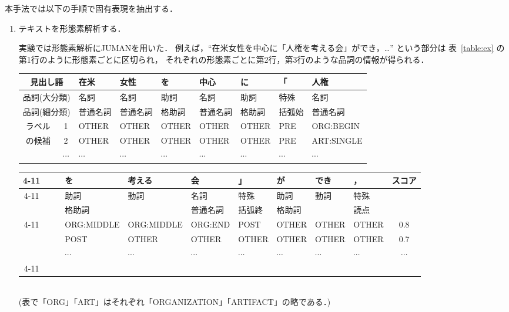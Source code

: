 本手法では以下の手順で固有表現を抽出する．
\begin{enumerate}
\item テキストを形態素解析する．

  実験では形態素解析にJUMAN\cite{JUMAN3.6}を用いた．
  例えば，``在米女性を中心に「人権を考える会」ができ，…''
  という部分は
  表~\ref{table:ex} の第1行のように形態素ごとに区切られ，
  それぞれの形態素ごとに第2行，第3行のような品詞の情報が得られる．

  {\small
    \begin{table*}[htbp]
      \begin{center}
        \caption{MEモデルを用いたラベル付与の例}
        \label{table:ex} 
        \begin{tabular}[c]{|c|c||l@{ }l@{ }l@{ }l@{ }l@{ }l@{ }l}
          \hline
          \multicolumn{2}{|c||}{見出し語} 
          & 在米 & 女性 & を & 中心 & に & 「 & 人権 \\
          \hline
          \multicolumn{2}{|c||}{品詞(大分類)} 
          & 名詞 & 名詞 & 助詞 & 名詞 & 助詞 & 特殊 & 名詞 \\
          \multicolumn{2}{|c||}{品詞(細分類)}
          & 普通名詞 & 普通名詞 & 格助詞 & 普通名詞 & 格助詞 
          & 括弧始 & 普通名詞 \\
          \hline
          ラベル & 1 & OTHER & OTHER & OTHER & OTHER & OTHER & PRE
          & ORG:BEGIN \\
          の候補 & 2 & OTHER & OTHER & OTHER & OTHER & OTHER & PRE 
          & ART:SINGLE \\
          & $\cdots$ & $\cdots$ & $\cdots$ & $\cdots$ & $\cdots$ & $\cdots$ 
          & $\cdots$ & $\cdots$ \\
          \hline
        \end{tabular}

        \vspace*{0.2cm}
        \begin{tabular}[c]{cccl@{ }l@{ }l@{ }l@{ }l@{ }l@{ }l|c|}
          \cline{4-11}
          & & & を & 考える & 会 & 」 & が & でき & ，& スコア\\
          \cline{4-11}
          & & & 助詞 & 動詞 & 名詞 & 特殊 & 助詞 & 動詞 & 特殊 & \\
          & & & 格助詞 & \* & 普通名詞 & 括弧終 & 格助詞 & \* & 読点 & \\
          \cline{4-11}
          & & & ORG:MIDDLE & ORG:MIDDLE & ORG:END & POST & OTHER 
          & OTHER & OTHER & 0.8\\
          & & & POST & OTHER & OTHER & OTHER & OTHER & OTHER & OTHER & 0.7\\
           & & & $\cdots$ & $\cdots$ & $\cdots$ & $\cdots$ & $\cdots$ 
          & $\cdots$ & $\cdots$ & $\cdots$ \\
          \cline{4-11}
        \end{tabular}\\
        \vspace*{1em}
      (表で「ORG」「ART」はそれぞれ「ORGANIZATION」「ARTIFACT」の略である．)
      \end{center}
    \end{table*}
    }


\end{enumerate}
